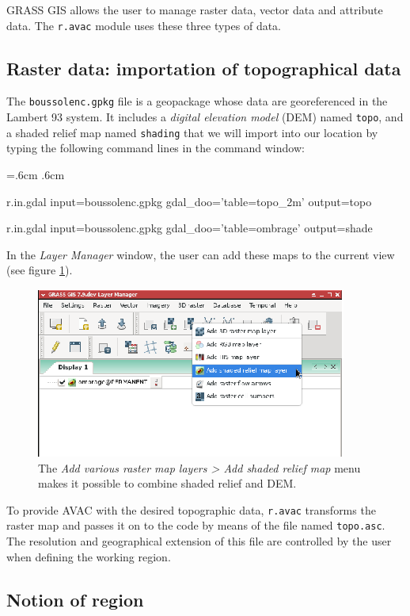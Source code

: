 \documentclass[12pt,oneside]{paper}
\newenvironment{code}{%
\vspace{2mm}%
\hangindent=.6cm%
\parindent.6cm%
\ttfamily%
\color{gris.3}%
}{
\vspace{2mm}%
}
\begin{document}
GRASS GIS allows the user to manage raster data, vector data and attribute data. The \verb+r.avac+ module uses these three types of data.

\subsection{Raster data: importation of topographical data}
The \texttt{boussolenc.gpkg} file is a geopackage whose data are georeferenced in the Lambert 93 system. It includes a \emph{digital elevation model} (DEM) named \texttt{topo}, and a shaded relief map named \texttt{shading} that we will import into our location by typing the following command lines in the command window:

\begin{code}
r.in.gdal input=boussolenc.gpkg gdal\_doo='table=topo\_2m' output=topo

r.in.gdal input=boussolenc.gpkg gdal\_doo='table=ombrage' output=shade
\end{code}

In the \emph{Layer Manager} window, the user can add these maps to the current view (see figure \ref{fig:shade}).

\begin{figure}[!h]
\begin{center}
\includegraphics[width=0.70\hsize]{capture3.eps}
\caption{The \emph{Add various raster map layers > Add shaded relief map} menu makes it possible to combine shaded relief and DEM.}
\label{fig:shade}
\end{center}
\end{figure}

To provide AVAC with the desired topographic data, \verb+r.avac+ transforms the raster map and passes it on to the code by means of the file named \texttt{topo.asc}. The resolution and geographical extension of this file are controlled by the user when defining the working region.


\subsection{Notion of region}
\end{document}
